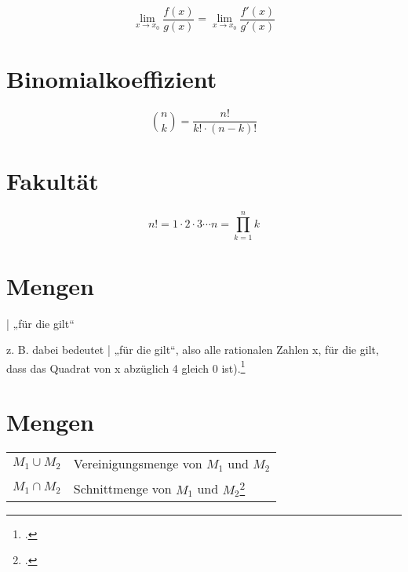 \documentclass{lehramt-informatik-haupt}
\begin{document}
\begin{displaymath}
\lim_{x \to x_0} \frac{f(x)}{g(x)} = \lim_{x \to x_0} \frac{f'(x)}{g'(x)}
\end{displaymath}

%

\section{Binomialkoeffizient}

\begin{displaymath}
\binom nk = \frac{n!}{k! \cdot (n-k)!}
\end{displaymath}

\section{Fakultät}

\begin{displaymath}
n! = 1\cdot 2 \cdot 3 \dotsm n = \prod_{k=1}^n k
\end{displaymath}

\section{Mengen}

| „für die gilt“

z. B. 
dabei bedeutet | „für die gilt“, also alle rationalen
Zahlen x, für die gilt, dass das Quadrat von x abzüglich 4 gleich 0
ist).\footcite[Seite 8]{foerster}

\section{Mengen}

\begin{tabular}{ll}
$M_1 \cup M_2$ &
Vereinigungsmenge von $M_1$ und $M_2$ \\

$M_1 \cap M_2$ &
Schnittmenge von $M_1$ und $M_2$\footcite[Seite 397]{hoffmann} \\
\end{tabular}
\literatur
\end{document}
